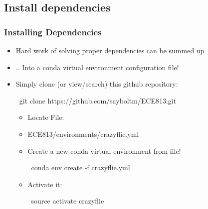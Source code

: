 \documentclass[t, xcolor=dvipsnames]{beamer} %
\begin{document}
\subsection{Install dependencies}
\begin{frame}
	\frametitle{Installing Dependencies}
	\begin{itemize}	
		\item Hard work of solving proper dependencies can be summed up
		\item .. Into a conda virtual environment configuration file!
		\item Simply clone (or view/search) this github repository:
			\begin{semiverbatim}
			\ git clone https://github.com/sayboltm/ECE813.git
			\end{semiverbatim} 
		\begin{itemize}
			\item Locate File:
			\item ECE813/environments/crazyflie.yml	
			\item Create a new conda virtual environment from file!
				\begin{semiverbatim}
				\ conda env create -f crazyflie.yml
				\end{semiverbatim}
			\item Activate it:	
				\begin{semiverbatim}
				\ source activate crazyflie
				\end{semiverbatim}
		\end{itemize}
	\end{itemize}
\end{frame}
\end{document}
